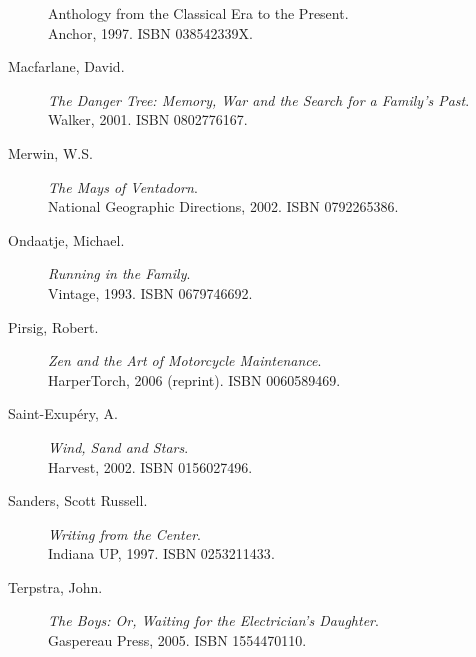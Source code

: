 \documentclass[letterpaper,10pt,headsepline]{scrreprt}
\begin{document}
\begin{description}
{    Anthology from the Classical Era to the Present}. \\Anchor, 1997.
  \textsc{ISBN 038542339X}.
\item [Macfarlane, David.] \textit{The Danger Tree: Memory, War and
    the Search for a Family's Past}. \\Walker, 2001. \textsc{ISBN
    0802776167}.
\item [Merwin, W.S.] \textit{The Mays of Ventadorn}. \\National
  Geographic Directions, 2002. \textsc{ISBN 0792265386}.
\item [Ondaatje, Michael.] \textit{Running in the Family}. \\Vintage,
  1993. \textsc{ISBN 0679746692}.
\item [Pirsig, Robert.] \textit{Zen and the Art of Motorcycle
    Maintenance}. \\HarperTorch, 2006 (reprint). \textsc{ISBN
    0060589469}.
\item [Saint-Exup\'ery, A.] \textit{Wind, Sand and Stars}. \\Harvest,
  2002. \textsc{ISBN 0156027496}.
\item [Sanders, Scott Russell.] \textit{Writing from the Center}.
  \\Indiana UP, 1997. \textsc{ISBN 0253211433}.
\item [Terpstra, John.] \textit{The Boys: Or, Waiting for the
    Electrician's Daughter}. \\Gaspereau Press, 2005. \textsc{ISBN
    1554470110}.
\end{description}
\end{document}
